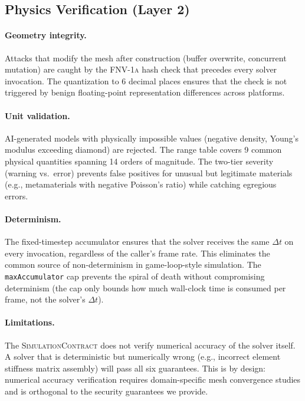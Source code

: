 \documentclass[letterpaper,twocolumn,10pt]{article}
\newcommand{\simcontract}{\textsc{SimulationContract}}
\newcommand{\fnvhash}{\textsc{FNV-1a}}
\begin{document}
\subsection{Physics Verification (Layer 2)}

\paragraph{Geometry integrity.} Attacks that modify the mesh after
construction (buffer overwrite, concurrent mutation) are caught by
the \fnvhash{} hash check that precedes every solver invocation.
The quantization to 6 decimal places ensures that the check is not
triggered by benign floating-point representation differences
across platforms.

\paragraph{Unit validation.} AI-generated models with physically
impossible values (negative density, Young's modulus exceeding
diamond) are rejected. The range table covers 9 common physical
quantities spanning 14 orders of magnitude. The two-tier severity
(warning vs.\ error) prevents false positives for unusual but
legitimate materials (e.g., metamaterials with negative Poisson's
ratio) while catching egregious errors.

\paragraph{Determinism.} The fixed-timestep accumulator ensures
that the solver receives the same $\Delta t$ on every invocation,
regardless of the caller's frame rate. This eliminates the common
source of non-determinism in game-loop-style simulation. The
\texttt{maxAccumulator} cap prevents the spiral of death without
compromising determinism (the cap only bounds how much wall-clock
time is consumed per frame, not the solver's $\Delta t$).

\paragraph{Limitations.} The \simcontract{} does not verify
numerical accuracy of the solver itself. A solver that is
deterministic but numerically wrong (e.g., incorrect element
stiffness matrix assembly) will pass all six guarantees. This
is by design: numerical accuracy verification requires
domain-specific mesh convergence studies and is orthogonal to the
security guarantees we provide.
\end{document}

